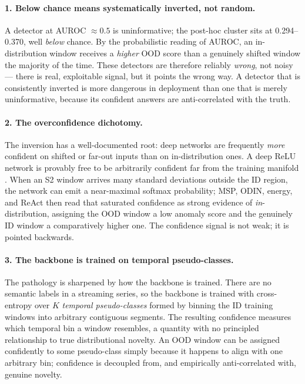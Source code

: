 \paragraph{1. Below chance means systematically inverted, not random.}
A detector at AUROC $\approx 0.5$ is uninformative; the post-hoc cluster sits at
\numrange{0.294}{0.370}, well \emph{below} chance. By the probabilistic reading of
AUROC, an in-distribution window receives a \emph{higher} OOD score than a genuinely
shifted window the majority of the time. These detectors are therefore reliably
\emph{wrong}, not noisy --- there is real, exploitable signal, but it points the
wrong way. A detector that is consistently inverted is more dangerous in deployment
than one that is merely uninformative, because its confident answers are
anti-correlated with the truth.

\paragraph{2. The overconfidence dichotomy.}
The inversion has a well-documented root: deep networks are frequently \emph{more}
confident on shifted or far-out inputs than on in-distribution ones. A deep ReLU
network is provably free to be arbitrarily confident far from the training manifold
\citep{Hein2019, Nguyen2015}. When an S2 window arrives many standard deviations
outside the ID region, the network can emit a near-maximal softmax probability;
MSP, ODIN, energy, and ReAct then read that saturated confidence as strong evidence
of \emph{in}-distribution, assigning the OOD window a low anomaly score and the
genuinely ID window a comparatively higher one. The confidence signal is not weak;
it is pointed backwards.

\paragraph{3. The backbone is trained on temporal pseudo-classes.}
The pathology is sharpened by how the backbone is trained. There are no semantic
labels in a streaming series, so the backbone is trained with cross-entropy over
$K$ \emph{temporal pseudo-classes} formed by binning the ID training windows into
arbitrary contiguous segments. The resulting confidence measures which temporal
bin a window resembles, a quantity with no principled relationship to true
distributional novelty. An OOD window can be assigned confidently to some
pseudo-class simply because it happens to align with one arbitrary bin; confidence
is decoupled from, and empirically anti-correlated with, genuine novelty.

